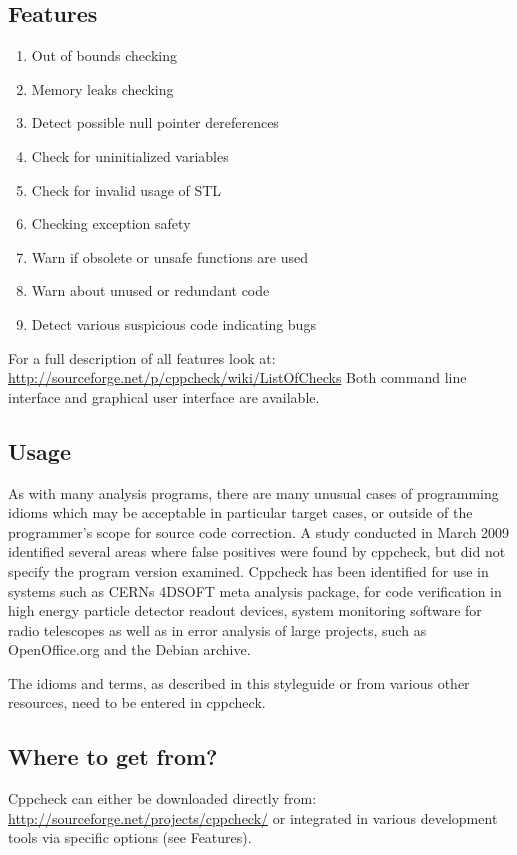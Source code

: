 \subsection{Features}
\begin{enumerate}
\item Out of bounds checking
\item Memory leaks checking
\item Detect possible null pointer dereferences
\item Check for uninitialized variables
\item Check for invalid usage of STL
\item Checking exception safety
\item Warn if obsolete or unsafe functions are used
\item Warn about unused or redundant code
\item Detect various suspicious code indicating bugs
\end{enumerate}

For a full description of all features look at: \url{http://sourceforge.net/p/cppcheck/wiki/ListOfChecks}
Both command line interface and graphical user interface are available.

\subsection{Usage}
As with many analysis programs, there are many unusual cases of programming idioms which may be acceptable in particular target cases, or outside of the programmer's scope for source code correction. A study conducted in March 2009 identified several areas where false positives were found by cppcheck, but did not specify the program version examined. Cppcheck has been identified for use in systems such as CERNs 4DSOFT meta analysis package, for code verification in high energy particle detector readout devices, system monitoring software for radio telescopes as well as in error analysis of large projects, such as OpenOffice.org and the Debian archive.

The idioms and terms, as described in this styleguide or from various other resources, need to be entered in cppcheck.

\subsection{Where to get from?}
Cppcheck can either be downloaded directly from: \url{http://sourceforge.net/projects/cppcheck/} or integrated in various development tools via specific options (see Features).


